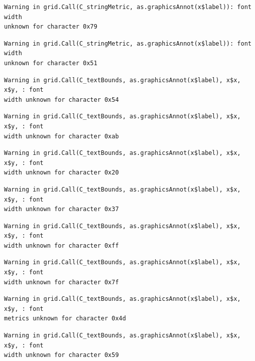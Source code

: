 \documentclass[
  letterpaper,
]{scrbook}
\begin{document}
\begin{verbatim}
Warning in grid.Call(C_stringMetric, as.graphicsAnnot(x$label)): font width
unknown for character 0x79
\end{verbatim}

\begin{verbatim}
Warning in grid.Call(C_stringMetric, as.graphicsAnnot(x$label)): font width
unknown for character 0x51
\end{verbatim}

\begin{verbatim}
Warning in grid.Call(C_textBounds, as.graphicsAnnot(x$label), x$x, x$y, : font
width unknown for character 0x54
\end{verbatim}

\begin{verbatim}
Warning in grid.Call(C_textBounds, as.graphicsAnnot(x$label), x$x, x$y, : font
width unknown for character 0xab
\end{verbatim}

\begin{verbatim}
Warning in grid.Call(C_textBounds, as.graphicsAnnot(x$label), x$x, x$y, : font
width unknown for character 0x20
\end{verbatim}

\begin{verbatim}
Warning in grid.Call(C_textBounds, as.graphicsAnnot(x$label), x$x, x$y, : font
width unknown for character 0x37
\end{verbatim}

\begin{verbatim}
Warning in grid.Call(C_textBounds, as.graphicsAnnot(x$label), x$x, x$y, : font
width unknown for character 0xff
\end{verbatim}

\begin{verbatim}
Warning in grid.Call(C_textBounds, as.graphicsAnnot(x$label), x$x, x$y, : font
width unknown for character 0x7f
\end{verbatim}

\begin{verbatim}
Warning in grid.Call(C_textBounds, as.graphicsAnnot(x$label), x$x, x$y, : font
metrics unknown for character 0x4d
\end{verbatim}

\begin{verbatim}
Warning in grid.Call(C_textBounds, as.graphicsAnnot(x$label), x$x, x$y, : font
width unknown for character 0x59
\end{verbatim}
\end{document}
